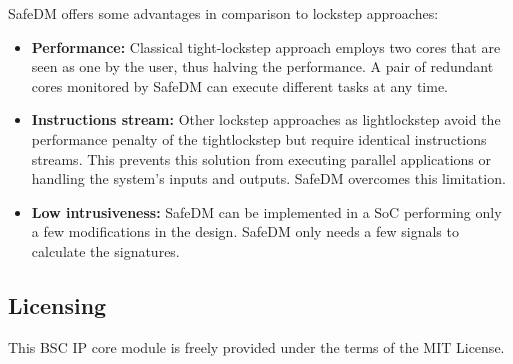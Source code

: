 SafeDM offers some advantages in comparison to lockstep approaches:
\begin{itemize}
	\item \textbf{Performance:} Classical tight-lockstep approach employs two cores that are seen as one by the user, thus halving the performance. A pair of redundant cores monitored by SafeDM can execute different tasks at any time.
	\item \textbf{Instructions stream:} Other lockstep approaches as light\-lockstep avoid the performance penalty of the tight\-lockstep but require identical instructions streams. This prevents this solution from executing parallel applications or handling the system's inputs and outputs. SafeDM overcomes this limitation.
    \item \textbf{Low intrusiveness:} SafeDM can be implemented in a SoC performing only a few modifications in the design. SafeDM only needs a few signals to calculate the signatures.
\end{itemize}



\subsection{Licensing}

This BSC IP core module is freely provided under the terms of the MIT License.



\hspace{5cm}
